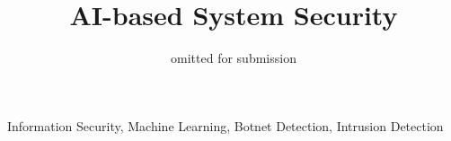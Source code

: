 \documentclass[conference, anonymous]{IEEEtran}
\begin{document}


\title{AI-based System Security}

\author{
omitted for submission
}

\maketitle

\begin{abstract}
\blindtext
\end{abstract}

\begin{IEEEkeywords}
Information Security, Machine Learning, Botnet Detection, Intrusion Detection
\end{IEEEkeywords}
















\end{document}
